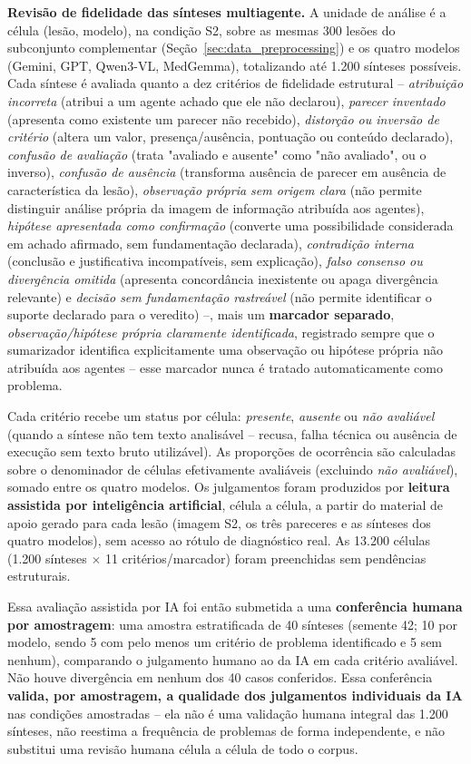 \textbf{Revisão de fidelidade das sínteses multiagente.} A unidade de análise é a célula (lesão, modelo), na condição S2, sobre as mesmas 300 lesões do subconjunto complementar (Seção~\ref{sec:data_preprocessing}) e os quatro modelos (Gemini, GPT, Qwen3-VL, MedGemma), totalizando até 1.200 sínteses possíveis. Cada síntese é avaliada quanto a dez critérios de fidelidade estrutural -- \textit{atribuição incorreta} (atribui a um agente achado que ele não declarou), \textit{parecer inventado} (apresenta como existente um parecer não recebido), \textit{distorção ou inversão de critério} (altera um valor, presença/ausência, pontuação ou conteúdo declarado), \textit{confusão de avaliação} (trata "avaliado e ausente" como "não avaliado", ou o inverso), \textit{confusão de ausência} (transforma ausência de parecer em ausência de característica da lesão), \textit{observação própria sem origem clara} (não permite distinguir análise própria da imagem de informação atribuída aos agentes), \textit{hipótese apresentada como confirmação} (converte uma possibilidade considerada em achado afirmado, sem fundamentação declarada), \textit{contradição interna} (conclusão e justificativa incompatíveis, sem explicação), \textit{falso consenso ou divergência omitida} (apresenta concordância inexistente ou apaga divergência relevante) e \textit{decisão sem fundamentação rastreável} (não permite identificar o suporte declarado para o veredito) --, mais um \textbf{marcador separado}, \textit{observação/hipótese própria claramente identificada}, registrado sempre que o sumarizador identifica explicitamente uma observação ou hipótese própria não atribuída aos agentes -- esse marcador nunca é tratado automaticamente como problema.

Cada critério recebe um status por célula: \textit{presente}, \textit{ausente} ou \textit{não avaliável} (quando a síntese não tem texto analisável -- recusa, falha técnica ou ausência de execução sem texto bruto utilizável). As proporções de ocorrência são calculadas sobre o denominador de células efetivamente avaliáveis (excluindo \textit{não avaliável}), somado entre os quatro modelos. Os julgamentos foram produzidos por \textbf{leitura assistida por inteligência artificial}, célula a célula, a partir do material de apoio gerado para cada lesão (imagem S2, os três pareceres e as sínteses dos quatro modelos), sem acesso ao rótulo de diagnóstico real. As 13.200 células (1.200 sínteses $\times$ 11 critérios/marcador) foram preenchidas sem pendências estruturais.

Essa avaliação assistida por IA foi então submetida a uma \textbf{conferência humana por amostragem}: uma amostra estratificada de 40 sínteses (semente 42; 10 por modelo, sendo 5 com pelo menos um critério de problema identificado e 5 sem nenhum), comparando o julgamento humano ao da IA em cada critério avaliável. Não houve divergência em nenhum dos 40 casos conferidos. Essa conferência \textbf{valida, por amostragem, a qualidade dos julgamentos individuais da IA} nas condições amostradas -- ela não é uma validação humana integral das 1.200 sínteses, não reestima a frequência de problemas de forma independente, e não substitui uma revisão humana célula a célula de todo o corpus.

